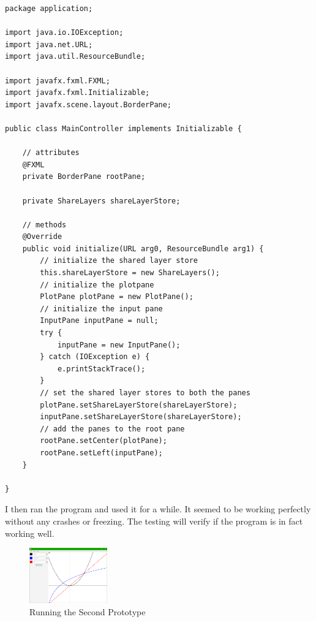 \documentclass[../../../../main.tex]{subfiles}
\begin{document}
\begin{verbatim}
package application;

import java.io.IOException;
import java.net.URL;
import java.util.ResourceBundle;

import javafx.fxml.FXML;
import javafx.fxml.Initializable;
import javafx.scene.layout.BorderPane;

public class MainController implements Initializable {

	// attributes
	@FXML
	private BorderPane rootPane;

	private ShareLayers shareLayerStore;

	// methods
	@Override
	public void initialize(URL arg0, ResourceBundle arg1) {
		// initialize the shared layer store
		this.shareLayerStore = new ShareLayers();
		// initialize the plotpane
		PlotPane plotPane = new PlotPane();
		// initialize the input pane
		InputPane inputPane = null;
		try {
			inputPane = new InputPane();
		} catch (IOException e) {
			e.printStackTrace();
		}
		// set the shared layer stores to both the panes
		plotPane.setShareLayerStore(shareLayerStore);
		inputPane.setShareLayerStore(shareLayerStore);
		// add the panes to the root pane
		rootPane.setCenter(plotPane);
		rootPane.setLeft(inputPane);
	}

}
\end{verbatim}
I then ran the program and used it for a while. It seemed to be working perfectly without any crashes or freezing. The testing will verify if the program is in fact working well.
\begin{figure}[H]
	\begin{center}
		\includegraphics[width=0.3\textwidth]{images/final}
	\end{center}
	\caption{Running the Second Prototype}
\end{figure}
\newpage
\end{document}
